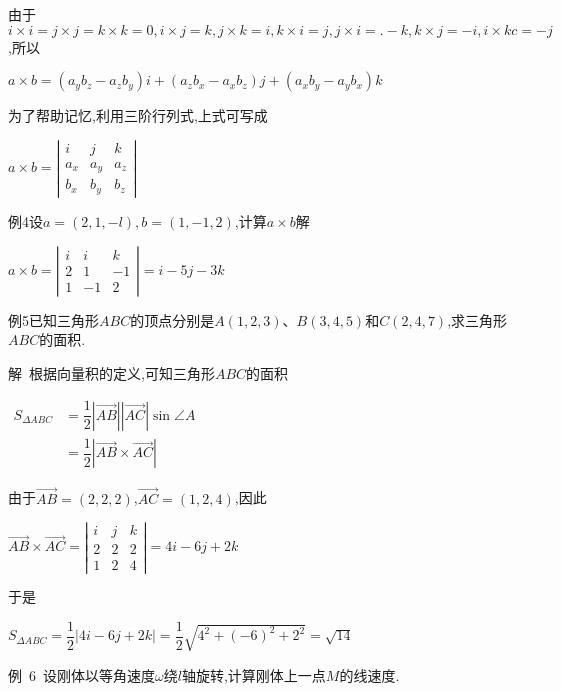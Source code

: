 \documentclass[oneside]{book}
\begin{document}
由于$i \times i = j \times j = k \times k = 0,i \times j = k,j \times k = i,k \times i = j,j \times i = . - k,k \times j =  - i,i \times kc =  - j$,所以

$a \times b = \left( {{a_y}{b_z} - {a_z}{b_y}} \right)i + \left( {{a_z}{b_x} - {a_x}{b_z}} \right)j + \left( {{a_x}{b_y} - {a_y}{b_x}} \right)k$

为了帮助记忆,利用三阶行列式,上式可写成

$a \times b=\left|\begin{array}{lll}{i} & {j} & {k} \\ {a_{x}} & {a_{y}} & {a_{z}} \\ {b_{x}} & {b_{y}} & {b_{z}}\end{array}\right|$

例4设$a = (2,1, - l),b = (1, - 1,2)$,计算$a \times b$解

$a \times b=\left|\begin{array}{ccc}{i} & {i} & {k} \\ {2} & {1} & {-1} \\ {1} & {-1} & {2}\end{array}\right|=i-5 j-3 k$

例5已知三角形$ABC$的顶点分别是$A\left( {1,2,3} \right)$、$B\left( {3,4,5} \right)$和$C\left( {2,4,7} \right)$,求三角形$ABC$的面积.

解~根据向量积的定义,可知三角形$ABC$的面积

$\begin{aligned} S_{\Delta A B C} &=\dfrac{1}{2}|\overrightarrow{A B}||\overrightarrow{A C}| \sin \angle A \\ &=\dfrac{1}{2}|\overrightarrow{A B} \times \overrightarrow{A C}| \end{aligned}$

由于$\overrightarrow {AB}  = \left( {2,2,2} \right)$,$\overrightarrow {AC}  = \left( {1,2,4} \right)$,因此

$\overrightarrow{A B} \times \overrightarrow{A C}=\left|\begin{array}{lll}{i} & {j} & {k} \\ {2} & {2} & {2} \\ {1} & {2} & {4}\end{array}\right|=4 i-6 j+2 k$

于是

${S_{\Delta ABC}} = \dfrac{1}{2}|4i - 6j + 2k| = \dfrac{1}{2}\sqrt {{4^2} + {{( - 6)}^2} + {2^2}}  = \sqrt {14} $

例~6~设刚体以等角速度$\omega $绕$l$轴旋转,计算刚体上一点$M$的线速度.
\end{document}

